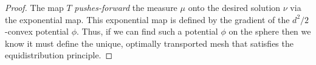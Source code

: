 \documentclass{article}
\theoremstyle{definition}
\begin{document}
\begin{proof}
The map $T$ \textit{pushes-forward} the measure $\mu$ onto the desired solution $\nu$ via the exponential map. This exponential map is defined by the gradient of the $d^2/2$-convex potential $\phi$.
Thus, if we can find such a potential $\phi$ on the sphere then we know it must define the unique, optimally transported mesh that satisfies the equidistribution principle.
\end{proof}






\end{document}
